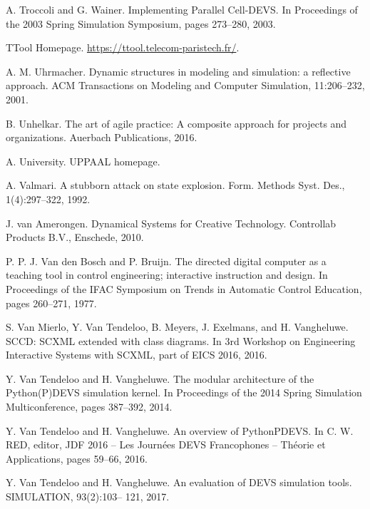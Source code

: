\begin{description}[style=nextline,leftmargin=12mm,labelwidth=10mm,font=\normalfont]
\item[{[273]}] A. Troccoli and G. Wainer. Implementing Parallel Cell-DEVS. In Proceedings of the 2003 Spring Simulation Symposium, pages 273–280, 2003.

\item[{[274]}] TTool Homepage. \url{https://ttool.telecom-paristech.fr/}.

\item[{[275]}] A. M. Uhrmacher. Dynamic structures in modeling and simulation: a reflective approach. ACM Transactions on Modeling and Computer Simulation, 11:206–232, 2001.

\item[{[276]}] B. Unhelkar. The art of agile practice: A composite approach for projects and organizations. Auerbach Publications, 2016.

\item[{[277]}] A. University. UPPAAL homepage.

\item[{[278]}] A. Valmari. A stubborn attack on state explosion. Form. Methods Syst. Des., 1(4):297–322, 1992.

\item[{[279]}] J. van Amerongen. Dynamical Systems for Creative Technology. Controllab Products B.V., Enschede, 2010.

\item[{[280]}] P. P. J. Van den Bosch and P. Bruijn. The directed digital computer as a teaching tool in control engineering; interactive instruction and design. In Proceedings of the IFAC Symposium on Trends in Automatic Control Education, pages 260–271, 1977.

\item[{[281]}] S. Van Mierlo, Y. Van Tendeloo, B. Meyers, J. Exelmans, and H. Vangheluwe. SCCD: SCXML extended with class diagrams. In 3rd Workshop on Engineering Interactive Systems with SCXML, part of EICS 2016, 2016.

\item[{[282]}] Y. Van Tendeloo and H. Vangheluwe. The modular architecture of the Python(P)DEVS simulation kernel. In Proceedings of the 2014 Spring Simulation Multiconference, pages 387–392, 2014.

\item[{[283]}] Y. Van Tendeloo and H. Vangheluwe. An overview of PythonPDEVS. In C. W. RED, editor, JDF 2016 – Les Journées DEVS Francophones – Théorie et Applications, pages 59–66, 2016.

\item[{[284]}] Y. Van Tendeloo and H. Vangheluwe. An evaluation of DEVS simulation tools. SIMULATION, 93(2):103– 121, 2017.


\end{description}
